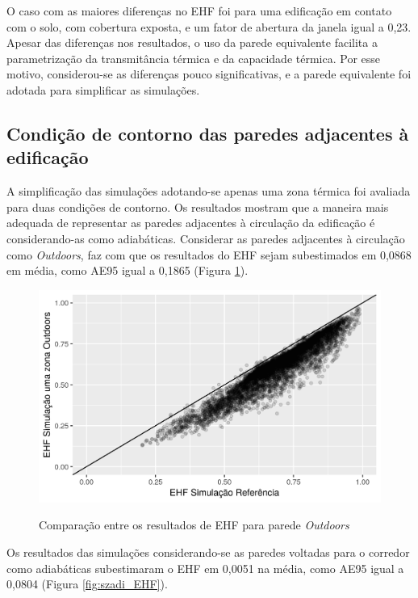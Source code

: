 \documentclass[brazil,hardcopy,openany,a4paper]{ufscthesis}
\begin{document}
		O caso com as maiores diferenças no EHF foi para uma edificação em contato com o solo, com cobertura exposta, e um fator de abertura da janela igual a 0,23.
		Apesar das diferenças nos resultados, o uso da parede equivalente facilita a parametrização da transmitância térmica e da capacidade térmica. Por esse motivo, considerou-se as diferenças pouco significativas, e a parede equivalente foi adotada para simplificar as simulações.
		
		\subsection{Condição de contorno das paredes adjacentes à edificação}
		
		A simplificação das simulações adotando-se apenas uma zona térmica foi avaliada para duas condições de contorno. Os resultados mostram que a maneira mais adequada de representar as paredes adjacentes à circulação da edificação é considerando-as como adiabáticas. Considerar as paredes adjacentes à circulação como \textit{Outdoors}, faz com que os resultados do EHF sejam subestimados em 0,0868 em média, como AE95 igual a 0,1865 (Figura \ref{fig:szout_EHF}).
		
		\begin{figure}[H]
			\centering
			\caption{Comparação entre os resultados de EHF para parede \textit{Outdoors}}
			\includegraphics[width=1\linewidth]{img/szout_EHF_scatter.png}
			\label{fig:szout_EHF}
		\end{figure}
		
		Os resultados das simulações considerando-se as paredes voltadas para o corredor como adiabáticas subestimaram o EHF em 0,0051 na média, como AE95 igual a 0,0804 (Figura \ref{fig:szadi_EHF}).
		
\end{document}
